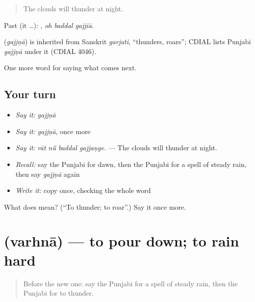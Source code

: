\begin{quote}
The clouds will thunder at night.
\end{quote}

Past (it …):   , \emph{oh baddal gajjiā}.

\begin{cousinweb}
\textbf{} (\emph{gajjṇā}) is inherited from Sanskrit \emph{garjati}, \textquotedblleft{}thunders, roars\textquotedblright{}; CDIAL lists Punjabi \emph{gajjṇā} under it (CDIAL 4046).
\end{cousinweb}

\begin{grammarlens}[title={What you've built}]
One more word for saying what comes next.
\end{grammarlens}

\subsection*{Your turn}
\begin{itemize}
\raggedright
  \item \emph{Say it:} \emph{gajjṇā}
  \item \emph{Say it:} \emph{gajjṇā}, once more
  \item \emph{Say it:} \emph{rāt nū̃ baddal gajjaṇge.} — The clouds will thunder at night.
  \item \emph{Recall:} say the Punjabi for dawn, then the Punjabi for a spell of steady rain, then say \emph{gajjṇā} again
  \item \emph{Write it:} copy \textbf{} once, checking the whole word
\end{itemize}

\begin{tcolorbox}[breakable,colback=teal!4,colframe=teal!35!black,title={Before you move on}]
What does  mean? (\textquotedblleft{}To thunder; to roar\textquotedblright{}.) Say it once more.
\end{tcolorbox}
\section[\texorpdfstring{\pa{ਵਰ੍ਹਨਾ} (varhnā)}{ਵਰ੍ਹਨਾ (varhnā)}]{ (varhnā) — to pour down; to rain hard}

\label{lesson:PA-C286-varhna}



\begin{quote}
Before the new one: say the Punjabi for a spell of steady rain, then the Punjabi for to thunder.
\end{quote}


